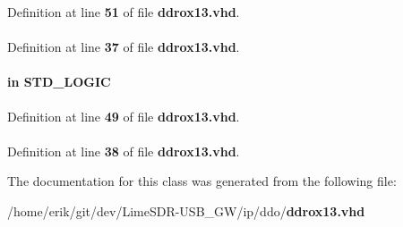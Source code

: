 Definition at line {\bf 51} of file {\bf ddrox13.\+vhd}.

\paragraph[{ieee}]{\hspace{0.3cm}{\ttfamily [Library]}}\label{classddrox13_a0a6af6eef40212dbaf130d57ce711256}


Definition at line {\bf 37} of file {\bf ddrox13.\+vhd}.

\paragraph[{outclock}]{ {\bfseries \textcolor{keywordflow}{in}\textcolor{vhdlchar}{ }} {\bfseries \textcolor{comment}{S\+T\+D\+\_\+\+L\+O\+G\+IC}\textcolor{vhdlchar}{ }} \hspace{0.3cm}{\ttfamily [Port]}}\label{classddrox13_ac1114a0b9414aabbfa8346eaf305eed2}


Definition at line {\bf 49} of file {\bf ddrox13.\+vhd}.

\paragraph[{std\+\_\+logic\+\_\+1164}]{\hspace{0.3cm}{\ttfamily [Package]}}\label{classddrox13_acd03516902501cd1c7296a98e22c6fcb}


Definition at line {\bf 38} of file {\bf ddrox13.\+vhd}.



The documentation for this class was generated from the following file\+:\begin{DoxyCompactItemize}
\item 
/home/erik/git/dev/\+Lime\+S\+D\+R-\/\+U\+S\+B\+\_\+\+G\+W/ip/ddo/{\bf ddrox13.\+vhd}\end{DoxyCompactItemize}
